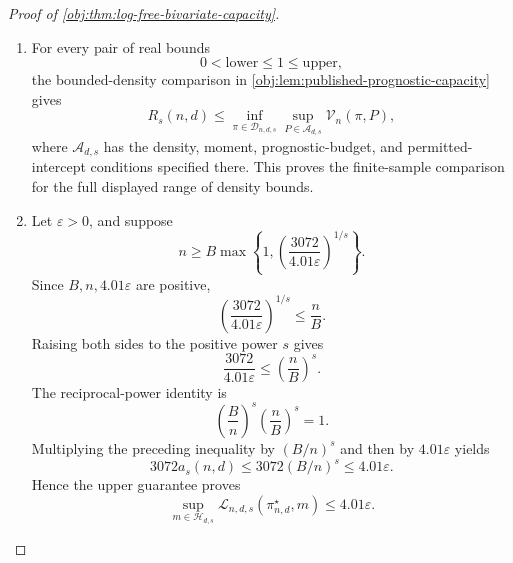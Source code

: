 \documentclass[11pt]{article}
\begin{document}
\begin{proof}[Proof of \cref{obj:thm:log-free-bivariate-capacity}]
\begin{enumerate}
For every admissible \(\pi\) and every \(m\in\mathcal H_{d,s}\),
\cref{obj:lem:ht-transfer} supplies the actual-estimator identity and finiteness:
\[
n\operatorname{Var}(\widehat\theta)-4.01
=
\mathcal L_{n,d,s}(\pi,m)<\infty.
\]
Under this completion, \(\widehat\theta=\widehat T_P\). Taking the supremum over the completions of all \(m\in\mathcal H_{d,s}\) therefore gives
\[
\sup_{P\in\mathcal G_{d,s}}\mathcal V_n(\pi,P)
=
\sup_{m\in\mathcal H_{d,s}}\mathcal L_{n,d,s}(\pi,m).
\]
Taking the admissible-design infimum, and separately selecting the constructed kernel, yields
\[
\inf_{\pi\in\mathcal D_{n,d,s}}
\sup_{P\in\mathcal G_{d,s}}\mathcal V_n(\pi,P)
=R_s(n,d),
\]
\[
\sup_{P\in\mathcal G_{d,s}}
\mathcal V_n(\pi^\star_{n,d},P)
=
\sup_{m\in\mathcal H_{d,s}}
\mathcal L_{n,d,s}(\pi^\star_{n,d},m).
\]
Finally, \cref{obj:lem:published-prognostic-capacity} supplies the proper inclusion
\[
\mathcal G_{d,s}\subsetneq\mathcal Q_{d,s}.
\]

\item
For every pair of real bounds
\[
0<\mathrm{lower}\leq1\leq\mathrm{upper},
\]
the bounded-density comparison in \cref{obj:lem:published-prognostic-capacity} gives
\[
R_s(n,d)
\leq
\inf_{\pi\in\mathcal D_{n,d,s}}
\sup_{P\in\mathcal A_{d,s}}\mathcal V_n(\pi,P),
\]
where \(\mathcal A_{d,s}\) has the density, moment, prognostic-budget, and permitted-intercept conditions specified there. This proves the finite-sample comparison for the full displayed range of density bounds.

\item
Let \(\varepsilon>0\), and suppose
\[
n\geq
B\max\left\{1,
\left(\frac{3072}{4.01\varepsilon}\right)^{1/s}\right\}.
\]
Since \(B,n,4.01\varepsilon\) are positive,
\[
\left(\frac{3072}{4.01\varepsilon}\right)^{1/s}
\leq\frac nB.
\]
Raising both sides to the positive power \(s\) gives
\[
\frac{3072}{4.01\varepsilon}
\leq\left(\frac nB\right)^s.
\]
The reciprocal-power identity is
\[
\left(\frac Bn\right)^s
\left(\frac nB\right)^s=1.
\]
Multiplying the preceding inequality by \((B/n)^s\) and then by
\(4.01\varepsilon\) yields
\[
3072a_s(n,d)
\leq3072(B/n)^s
\leq4.01\varepsilon.
\]
Hence the upper guarantee proves
\[
\sup_{m\in\mathcal H_{d,s}}
\mathcal L_{n,d,s}(\pi^\star_{n,d},m)
\leq4.01\varepsilon.
\]


\end{enumerate}
\end{proof}
\end{document}
